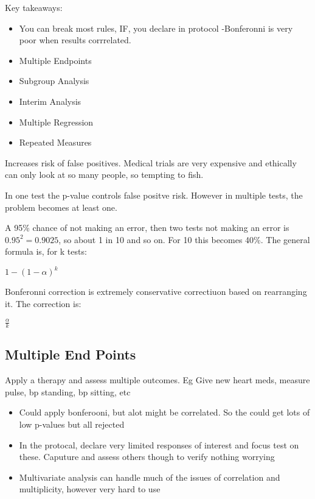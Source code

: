 \documentclass[
  letterpaper,
  DIV=11,
  numbers=noendperiod]{scrreprt}
\providecommand{\tightlist}{%
  \setlength{\itemsep}{0pt}\setlength{\parskip}{0pt}}\usepackage{longtable,booktabs,array}
\begin{document}
Key takeaways:

\begin{itemize}
\item
  You can break most rules, IF, you declare in protocol -Bonferonni is
  very poor when results corrrelated.
\item
  Multiple Endpoints
\item
  Subgroup Analysis
\item
  Interim Analysis
\item
  Multiple Regression
\item
  Repeated Measures
\end{itemize}

Increases risk of false positives. Medical trials are very expensive and
ethically can only look at so many people, so tempting to fish.

In one test the p-value controls false positve risk. However in multiple
tests, the problem becomes at least one.

A 95\% chance of not making an error, then two tests not making an error
is \(0.95^2 = 0.9025\), so about 1 in 10 and so on. For 10 this becomes
40\%. The general formula is, for k tests:

\(1-(1-\alpha)^k\)

Bonferonni correction is extremely conservative correctiuon based on
rearranging it. The correction is:

\(\frac{\alpha}{k}\)

\hypertarget{multiple-end-points}{%
\subsection{Multiple End Points}\label{multiple-end-points}}

Apply a therapy and assess multiple outcomes. Eg Give new heart meds,
measure pulse, bp standing, bp sitting, etc

\begin{itemize}
\tightlist
\item
  Could apply bonferooni, but alot might be correlated. So the could get
  lots of low p-values but all rejected
\item
  In the protocal, declare very limited responses of interest and focus
  test on these. Caputure and assess others though to verify nothing
  worrying
\item
  Multivariate analysis can handle much of the issues of correlation and
  multiplicity, however very hard to use
\end{itemize}
\end{document}

